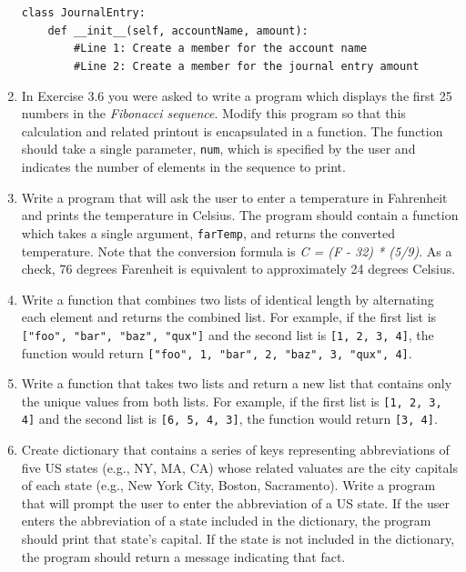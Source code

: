 \documentclass{book}
\begin{document}
\begin{enumerate}
	\texttt{class JournalEntry: \\ \mbox{~~~~}def \_\_init\_\_(self, accountName, amount): \\ \mbox{~~~~~~~~}\#Line 1: Create a member for the account name \\ \mbox{~~~~~~~~}\#Line 2: Create a member for the journal entry amount}
	\item In Exercise 3.6 you were asked to write a program which displays the first 25 numbers in the \textit{Fibonacci sequence}. Modify this program so that this calculation and related printout is encapsulated in a function. The function should take a single parameter, \texttt{num}, which is specified by the user and indicates the number of elements in the sequence to print. 
	
	\item Write a program that will ask the user to enter a temperature in Fahrenheit and prints the temperature in Celsius. The program should contain a function which takes a single argument, \texttt{farTemp}, and returns the converted temperature. Note that the conversion formula is \textit{C = (F - 32) * (5/9)}. As a check, 76 degrees Farenheit is equivalent to approximately 24 degrees Celsius.
	
	\item Write a function that combines two lists of identical length by alternating each element and returns the combined list. For example, if the first list is \texttt{["foo", "bar", "baz", "qux"]} and the second list is \texttt{[1, 2, 3, 4]}, the function would return \texttt{["foo", 1, "bar", 2, "baz", 3, "qux", 4]}.
	
	\item Write a function that takes two lists and return a new list that contains only the unique values from both lists. For example, if the first list is \texttt{[1, 2, 3, 4]} and the second list is \texttt{[6, 5, 4, 3]}, the function would return \texttt{[3, 4]}.
	
	\item Create dictionary that contains a series of keys representing abbreviations of five US states (e.g., NY, MA, CA) whose related valuates are the city capitals of each state (e.g., New York City, Boston, Sacramento). Write a program that will prompt the user to enter the abbreviation of a US state. If the user enters the abbreviation of a state included in the dictionary, the program should print that state's capital. If the state is not included in the dictionary, the program should return a message indicating that fact.
	

\end{enumerate}
\end{document}
